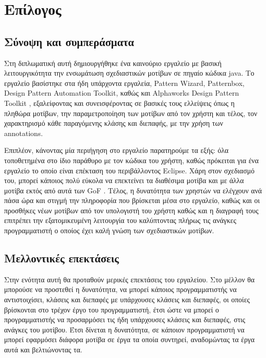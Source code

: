 \chapter{Επίλογος}
\label{ch:epilogue}
\section{Σύνοψη και συμπεράσματα}
\label{sec:conclusion}
Στη διπλωματική αυτή δημιουργήθηκε ένα καινούριο εργαλείο 
με βασική λειτουργικότητα την ενσωμάτωση σχεδιαστικών μοτίβων σε πηγαίο κώδικα java. 
Το εργαλείο βασίστηκε στα ήδη υπάρχοντα εργαλεία, Pattern Wizard, Patternbox, Design Pattern Automation Toolkit, καθώς και 
Alphaworks Design Pattern Toolkit \cite{PatternBox}, εξαλείφοντας  και συνεισφέροντας  σε βασικές 
τους ελλείψεις όπως η πληθώρα μοτίβων, την παραμετροποίηση των μοτίβων από τον χρήστη και τέλος, τον χαρακτηρισμό 
κάθε παραγόμενης κλάσης και διεπαφής, με την χρήση των annotations.\par
Επιπλέον, κάνοντας μία περιήγηση στο εργαλείο παρατηρούμε τα εξής: όλα τοποθετημένα στο ίδιο παράθυρο με τον κώδικα του χρήστη, 
καθώς πρόκειται για ένα εργαλείο το οποίο είναι επέκταση του περιβάλλοντος Eclipse.
Χάρη στον σχεδιασμό του, μπορεί κάποιος πολύ εύκολα να επεκτείνει τα διαθέσιμα μοτίβα 
και με άλλα μοτίβα εκτός από αυτά των GoF \cite{GoF}. Τέλος, η δυνατότητα των χρηστών να ελέγχουν ανά πάσα ώρα και στιγμή 
την πληροφορία που βρίσκεται μέσα στο εργαλείο, καθώς και οι προσθήκες  νέων μοτίβων από τον υπολογιστή του χρήστη καθώς 
και η διαγραφή τους επιτρέπει την εξατομικευμένη λειτουργία του καλύπτοντας πλήρως τις ανάγκες 
προγραμματιστή ο οποίος έχει καλή γνώση των σχεδιαστικών μοτίβων.
\section{Μελλοντικές επεκτάσεις}
\label{sec:features}
Στην ενότητα αυτή θα προταθούν μερικές επεκτάσεις του εργαλείου. Στο μέλλον θα μπορούσε να προστεθεί η δυνατότητα, 
να μπορεί κάποιος προγραμματιστής να αντιστοιχίσει, κλάσεις και διεπαφές με υπάρχουσες κλάσεις και διεπαφές, 
οι οποίες βρίσκονται στο τρέχον έργο του προγραμματιστή, έτσι ώστε να μπορεί ο προγραμματιστής να προσαρμόσει 
τις ήδη υπάρχουσες κλάσεις και διεπαφές, στις ανάγκες του μοτίβου. Έτσι δίνεται η δυνατότητα, 
σε κάποιον προγραμματιστή να μπορεί εφαρμόσει διάφορα μοτίβα σε έργα τα οποία συντηρεί, 
αναδομώντας τα έργα αυτά και βελτιώνοντας τα.
